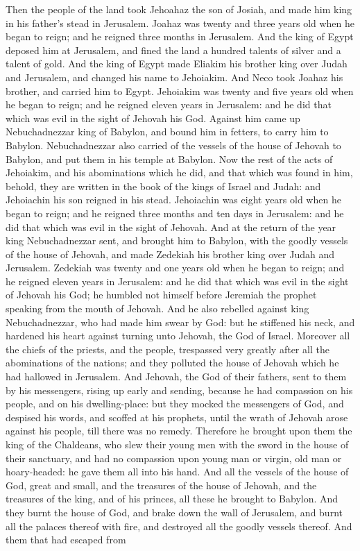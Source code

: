 Then the people of the land took Jehoahaz the son of Josiah, and made him king in his father’s stead in Jerusalem. Joahaz was twenty and three years old when he began to reign; and he reigned three months in Jerusalem. And the king of Egypt deposed him at Jerusalem, and fined the land a hundred talents of silver and a talent of gold. And the king of Egypt made Eliakim his brother king over Judah and Jerusalem, and changed his name to Jehoiakim. And Neco took Joahaz his brother, and carried him to Egypt.  Jehoiakim was twenty and five years old when he began to reign; and he reigned eleven years in Jerusalem: and he did that which was evil in the sight of Jehovah his God. Against him came up Nebuchadnezzar king of Babylon, and bound him in fetters, to carry him to Babylon. Nebuchadnezzar also carried of the vessels of the house of Jehovah to Babylon, and put them in his temple at Babylon. Now the rest of the acts of Jehoiakim, and his abominations which he did, and that which was found in him, behold, they are written in the book of the kings of Israel and Judah: and Jehoiachin his son reigned in his stead.  Jehoiachin was eight years old when he began to reign; and he reigned three months and ten days in Jerusalem: and he did that which was evil in the sight of Jehovah. And at the return of the year king Nebuchadnezzar sent, and brought him to Babylon, with the goodly vessels of the house of Jehovah, and made Zedekiah his brother king over Judah and Jerusalem.  Zedekiah was twenty and one years old when he began to reign; and he reigned eleven years in Jerusalem: and he did that which was evil in the sight of Jehovah his God; he humbled not himself before Jeremiah the prophet speaking from the mouth of Jehovah. And he also rebelled against king Nebuchadnezzar, who had made him swear by God: but he stiffened his neck, and hardened his heart against turning unto Jehovah, the God of Israel. Moreover all the chiefs of the priests, and the people, trespassed very greatly after all the abominations of the nations; and they polluted the house of Jehovah which he had hallowed in Jerusalem. And Jehovah, the God of their fathers, sent to them by his messengers, rising up early and sending, because he had compassion on his people, and on his dwelling-place: but they mocked the messengers of God, and despised his words, and scoffed at his prophets, until the wrath of Jehovah arose against his people, till there was no remedy.  Therefore he brought upon them the king of the Chaldeans, who slew their young men with the sword in the house of their sanctuary, and had no compassion upon young man or virgin, old man or hoary-headed: he gave them all into his hand. And all the vessels of the house of God, great and small, and the treasures of the house of Jehovah, and the treasures of the king, and of his princes, all these he brought to Babylon. And they burnt the house of God, and brake down the wall of Jerusalem, and burnt all the palaces thereof with fire, and destroyed all the goodly vessels thereof. And them that had escaped from 